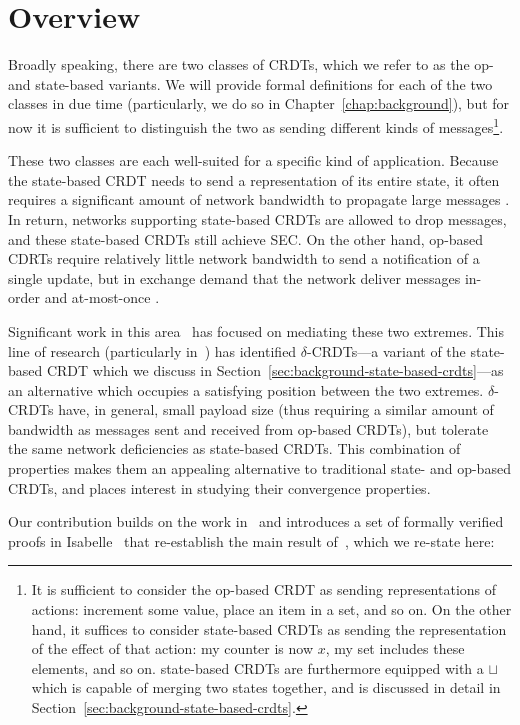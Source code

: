 \section{Overview}
Broadly speaking, there are two classes of CRDTs, which we refer to as the op-
and state-based variants. We will provide formal definitions for each of the two
classes in due time (particularly, we do so in Chapter~\ref{chap:background}),
but for now it is sufficient to distinguish the two as sending different kinds
of messages\footnote{It is sufficient to consider the op-based CRDT as sending
representations of actions: increment some value, place an item in a set, and so
on. On the other hand, it suffices to consider state-based CRDTs as sending the
representation of the effect of that action: my counter is now $x$, my set
includes these elements, and so on. state-based CRDTs are furthermore equipped
with a $\sqcup$ which is capable of merging two states together, and is
discussed in detail in Section~\ref{sec:background-state-based-crdts}.}.

These two classes are each well-suited for a specific kind of application.
Because the state-based CRDT needs to send a representation of its entire state,
it often requires a significant amount of network bandwidth to propagate large
messages \TODO[cite]. In return, networks supporting state-based CRDTs are
allowed to drop messages, and these state-based CRDTs still achieve SEC. On the
other hand, op-based CDRTs require relatively little network bandwidth to send
a notification of a single update, but in exchange demand that the network
deliver messages in-order and at-most-once \TODO[cite].

Significant work in this area~\cite{almedia18, enes18, cabrita17, vanDerLinde16}
has focused on mediating these two extremes. This line of research (particularly
in~\citep{almedia18}) has identified $\delta$-CRDTs---a variant of the
state-based CRDT which we discuss in
Section~\ref{sec:background-state-based-crdts}---as an alternative which
occupies a satisfying position between the two extremes.  $\delta$-CRDTs have,
in general, small payload size (thus requiring a similar amount of bandwidth as
messages sent and received from op-based CRDTs), but tolerate the same network
deficiencies as state-based CRDTs. This combination of properties makes them an
appealing alternative to traditional state- and op-based CRDTs, and places
interest in studying their convergence properties.

Our contribution builds on the work in~\citep{gomes17} and introduces a
set of formally verified proofs in Isabelle~\citep{wenzel02} that re-establish
the main result of~\citep{almedia18}, which we re-state here:

